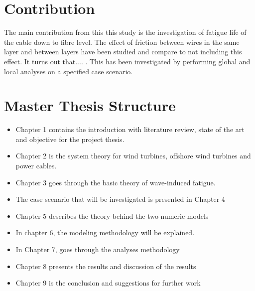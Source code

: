 \section{Contribution}
The main contribution from this this study is the investigation of fatigue life of the cable down to fibre level. The effect of friction between wires in the same layer and between layers have been studied and compare to not including this effect. It turns out that.... . This has been investigated by performing global and local analyses on a specified case scenario. 
\section{Master Thesis Structure}
\begin{itemize}
    \item Chapter 1 contains the introduction with literature review, state of the art and objective for the project thesis.
     \item Chapter 2 is the system theory for wind turbines, offshore wind turbines and power cables.
      \item Chapter 3 goes through the basic theory of wave-induced fatigue. 
      \item The case scenario that will be investigated is presented in Chapter 4
      \item Chapter 5 describes the theory behind the two numeric models
      \item In chapter 6, the modeling methodology will be explained.
      \item In Chapter 7, goes through the analyses methodology
      \item Chapter 8 presents the results and discussion of the results
      \item Chapter 9 is the conclusion and suggestions for further work
\end{itemize}

